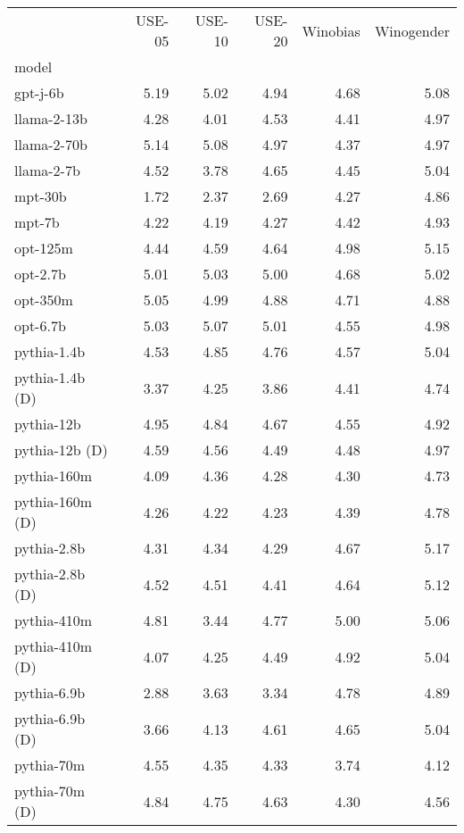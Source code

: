 \begin{tabular}{lrrrrr}
 & USE-05 & USE-10 & USE-20 & Winobias & Winogender \\
model &  &  &  &  &  \\
gpt-j-6b & 5.19 & 5.02 & 4.94 & 4.68 & 5.08 \\
llama-2-13b & 4.28 & 4.01 & 4.53 & 4.41 & 4.97 \\
llama-2-70b & 5.14 & 5.08 & 4.97 & 4.37 & 4.97 \\
llama-2-7b & 4.52 & 3.78 & 4.65 & 4.45 & 5.04 \\
mpt-30b & 1.72 & 2.37 & 2.69 & 4.27 & 4.86 \\
mpt-7b & 4.22 & 4.19 & 4.27 & 4.42 & 4.93 \\
opt-125m & 4.44 & 4.59 & 4.64 & 4.98 & 5.15 \\
opt-2.7b & 5.01 & 5.03 & 5.00 & 4.68 & 5.02 \\
opt-350m & 5.05 & 4.99 & 4.88 & 4.71 & 4.88 \\
opt-6.7b & 5.03 & 5.07 & 5.01 & 4.55 & 4.98 \\
pythia-1.4b & 4.53 & 4.85 & 4.76 & 4.57 & 5.04 \\
pythia-1.4b (D) & 3.37 & 4.25 & 3.86 & 4.41 & 4.74 \\
pythia-12b & 4.95 & 4.84 & 4.67 & 4.55 & 4.92 \\
pythia-12b (D) & 4.59 & 4.56 & 4.49 & 4.48 & 4.97 \\
pythia-160m & 4.09 & 4.36 & 4.28 & 4.30 & 4.73 \\
pythia-160m (D) & 4.26 & 4.22 & 4.23 & 4.39 & 4.78 \\
pythia-2.8b & 4.31 & 4.34 & 4.29 & 4.67 & 5.17 \\
pythia-2.8b (D) & 4.52 & 4.51 & 4.41 & 4.64 & 5.12 \\
pythia-410m & 4.81 & 3.44 & 4.77 & 5.00 & 5.06 \\
pythia-410m (D) & 4.07 & 4.25 & 4.49 & 4.92 & 5.04 \\
pythia-6.9b & 2.88 & 3.63 & 3.34 & 4.78 & 4.89 \\
pythia-6.9b (D) & 3.66 & 4.13 & 4.61 & 4.65 & 5.04 \\
pythia-70m & 4.55 & 4.35 & 4.33 & 3.74 & 4.12 \\
pythia-70m (D) & 4.84 & 4.75 & 4.63 & 4.30 & 4.56 \\
\end{tabular}
